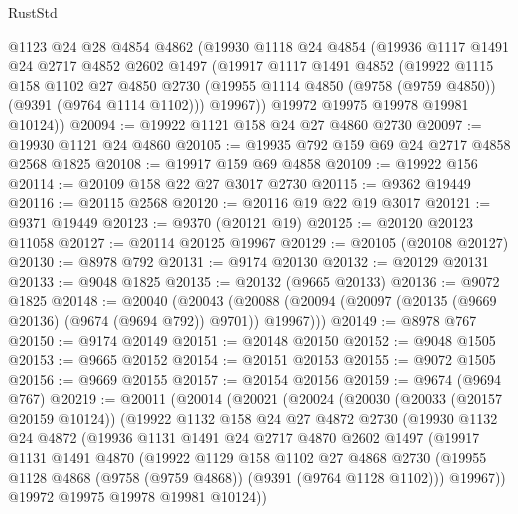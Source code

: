 \begin{lexlean}{RustStd}
\begin{coremodule}
    @1123
    @24
    @28
    @4854
    @4862
    (@19930
      @1118
      @24
      @4854
      (@19936
        @1117
        @1491
        @24
        @2717
        @4852
        @2602
        @1497
        (@19917
          @1117
          @1491
          @4852
          (@19922
            @1115
            @158
            @1102
            @27
            @4850
            @2730
            (@19955 @1114 @4850 (@9758 (@9759 @4850)) (@9391 (@9764 @1114 @1102)))
            @19967))
        @19972
        @19975
        @19978
        @19981
        @10124))
@20094 := @19922 @1121 @158 @24 @27 @4860 @2730
@20097 := @19930 @1121 @24 @4860
@20105 := @19935 @792 @159 @69 @24 @2717 @4858 @2568 @1825
@20108 := @19917 @159 @69 @4858
@20109 := @19922 @156
@20114 := @20109 @158 @22 @27 @3017 @2730
@20115 := @9362 @19449
@20116 := @20115 @2568
@20120 := @20116 @19 @22 @19 @3017
@20121 := @9371 @19449
@20123 := @9370 (@20121 @19)
@20125 := @20120 @20123 @11058
@20127 := @20114 @20125 @19967
@20129 := @20105 (@20108 @20127)
@20130 := @8978 @792
@20131 := @9174 @20130
@20132 := @20129 @20131
@20133 := @9048 @1825
@20135 := @20132 (@9665 @20133)
@20136 := @9072 @1825
@20148 := @20040
    (@20043 (@20088 (@20094 (@20097 (@20135 (@9669 @20136) (@9674 (@9694 @792)) @9701)) @19967)))
@20149 := @8978 @767
@20150 := @9174 @20149
@20151 := @20148 @20150
@20152 := @9048 @1505
@20153 := @9665 @20152
@20154 := @20151 @20153
@20155 := @9072 @1505
@20156 := @9669 @20155
@20157 := @20154 @20156
@20159 := @9674 (@9694 @767)
@20219 := @20011
    (@20014
      (@20021
        (@20024
          (@20030
            (@20033 (@20157 @20159 @10124))
            (@19922
              @1132
              @158
              @24
              @27
              @4872
              @2730
              (@19930
                @1132
                @24
                @4872
                (@19936
                  @1131
                  @1491
                  @24
                  @2717
                  @4870
                  @2602
                  @1497
                  (@19917
                    @1131
                    @1491
                    @4870
                    (@19922
                      @1129
                      @158
                      @1102
                      @27
                      @4868
                      @2730
                      (@19955 @1128 @4868 (@9758 (@9759 @4868)) (@9391 (@9764 @1128 @1102)))
                      @19967))
                  @19972
                  @19975
                  @19978
                  @19981
                  @10124))

\end{coremodule}
\end{lexlean}

